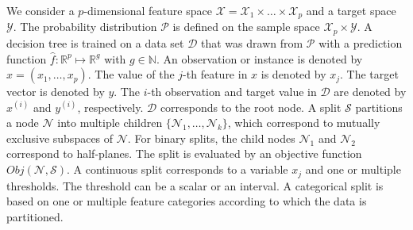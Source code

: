 \documentclass[a4paper, 11pt]{article}
\newcommand{\Data}{\mathcal{D}}
\newcommand{\Node}{\mathcal{N}}
\newcommand{\Split}{\mathcal{S}}
\begin{document}
We consider a $p$-dimensional feature space $\mathcal{X} = \mathcal{X}_1 \times \dots \times \mathcal{X}_p$ and a target space $\mathcal{Y}$. The probability distribution $\mathcal{P}$ is defined on the sample space $\mathcal{X}_p \times \mathcal{Y}$. A decision tree is trained on a data set $\mathcal{D}$ that was drawn from $\mathcal{P}$ with a prediction function $\widehat{f}: \mathbb{R}^p \mapsto \mathbb{R}^g$ with $g \in \mathbb{N}$. An observation or instance is denoted by $x = (x_1, \dots, x_p)$. The value of the $j$-th feature in $x$ is denoted by $x_j$. The target vector is denoted by $y$. The 
$i$-th observation and target value in $\Data$ are denoted by $x^{(i)}$ and $y^{(i)}$, respectively. $\Data$ corresponds to the root node. A split $\Split$ partitions a node $\Node$ into multiple 
children $\{\Node_1, \dots, \Node_k\}$, which correspond to mutually exclusive subspaces of $\Node$.  For binary splits, the child nodes $\Node_1$ and $\Node_2$ correspond to half-planes. The split is evaluated by an objective function $Obj(\Node, \Split)$.
A continuous split corresponds to a variable $x_j$ and one or multiple thresholds. The threshold can be a scalar or an interval. A categorical split is based on one or multiple feature categories according to which the data is partitioned.






    
\end{document}
